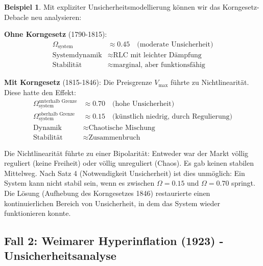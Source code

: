 \documentclass[a4paper, 12pt, twoside, openright]{report}
\theoremstyle{definition}
\theoremstyle{definition}
\newtheorem{beispiel}{Beispiel}[chapter]
\begin{document}
\begin{beispiel}

Mit expliziter Unsicherheitsmodellierung können wir das Korngesetz-Debacle neu analysieren:

\textbf{Ohne Korngesetz} (1790-1815):
\begin{align}
\Omega_{\text{system}} &\approx 0.45 \quad \text{(moderate Unsicherheit)} \\
\text{Systemdynamik} &\approx \text{RLC mit leichter Dämpfung} \\
\text{Stabilität} &\approx \text{marginal, aber funktionsfähig}
\end{align}

\textbf{Mit Korngesetz} (1815-1846):
Die Preisgrenze $V_{\max}$ führte zu Nichtlinearität. Diese hatte den Effekt:
\begin{align}
\Omega_{\text{system}}^{\text{unterhalb Grenze}} &\approx 0.70 \quad \text{(hohe Unsicherheit)} \\
\Omega_{\text{system}}^{\text{oberhalb Grenze}} &\approx 0.15 \quad \text{(künstlich niedrig, durch Regulierung)} \\
\text{Dynamik} &\approx \text{Chaotische Mischung} \\
\text{Stabilität} &\approx \text{Zusammenbruch}
\end{align}

Die Nichtlinearität führte zu einer Bipolarität: Entweder war der Markt völlig reguliert (keine Freiheit) oder völlig unreguliert (Chaos). Es gab keinen stabilen Mittelweg.
Nach Satz 4 (Notwendigkeit Unsicherheit) ist dies unmöglich: Ein System kann nicht stabil sein, wenn es zwischen $\Omega = 0.15$ und $\Omega = 0.70$ springt.
Die Lösung (Aufhebung des Korngesetzes 1846) restaurierte einen kontinuierlichen Bereich von Unsicherheit, in dem das System wieder funktionieren konnte.

\end{beispiel}

\subsection{Fall 2: Weimarer Hyperinflation (1923) - Unsicherheitsanalyse}
\end{document}
